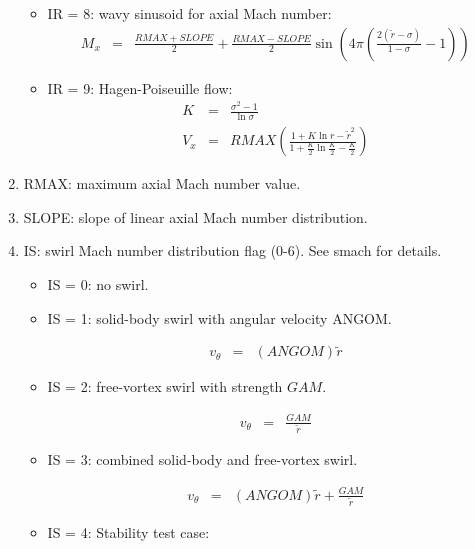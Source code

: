 \documentclass[12pt]{article}
\begin{document}
\begin{enumerate}
{\begin{itemize}
{\begin{eqnarray}
\left(
\widetilde{r}^2
- \left(1+\sigma \right) \widetilde{r}
+ \sigma 
\right)
\nonumber
\end{eqnarray}
}
\item{IR = 8: wavy sinusoid for axial Mach number:
\begin{eqnarray}
M_x &=& 
\frac{RMAX + SLOPE}{2}
+
\frac{RMAX-SLOPE}{2} \sin{\left(4 \pi \left(\frac{2 \left(\widetilde{r}-\sigma \right)}{1-\sigma} - 1 \right) \right)}
\nonumber
\end{eqnarray}
}
\item{IR = 9: Hagen-Poiseuille flow:
\begin{eqnarray}
K &=&
\frac{\sigma^2-1}{\ln{\sigma}} 
\nonumber
\\
V_x &=& 
RMAX \left(
\frac{
1 + K \ln{r} - \widetilde{r}^2
}{
1 + \frac{K}{2} \ln{\frac{K}{2}} - \frac{K}{2}
}
\right)
\nonumber
\end{eqnarray}
}
\end{itemize}
}
\item{RMAX: maximum axial Mach number value.}
\item{SLOPE: slope of linear axial Mach number distribution.}
\item{IS: swirl Mach number distribution flag (0-6). See smach for details.
\begin{itemize}
\item{IS = 0: no swirl.
}
\item{IS = 1: solid-body swirl with angular velocity ANGOM.

\begin{eqnarray}
v_{\theta} &=& \left(ANGOM \right) \widetilde{r}
\nonumber
\end{eqnarray}

}
\item{IS = 2: free-vortex swirl with strength $GAM$.

\begin{eqnarray}
v_{\theta} &=& \frac{GAM}{ \widetilde{r}}
\nonumber
\end{eqnarray}

}
\item{IS = 3: combined solid-body and free-vortex swirl.

\begin{eqnarray}
v_{\theta} &=& \left(ANGOM \right) \widetilde{r}
+\frac{GAM}{ \widetilde{r}}
\nonumber
\end{eqnarray}

}
\item{IS = 4: Stability test case:

}
\end{itemize}}
\end{enumerate}
\end{document}
